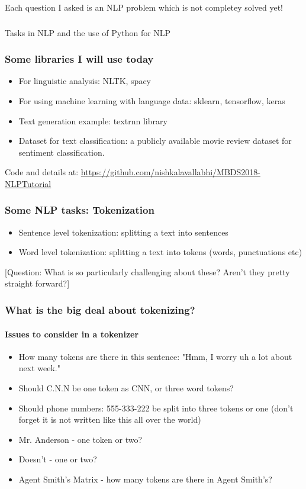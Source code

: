 \documentclass{beamer}
\begin{document}
\begin{frame}
Each question I asked is an NLP problem which is not completey solved yet!
\end{frame} 

\begin{frame}
\frametitle{}
\Large Tasks in NLP and the use of Python for NLP \small
\end{frame}

\begin{frame}
\frametitle{Some libraries I will use today}
\begin{itemize}
\item For linguistic analysis: NLTK, spacy
\item For using machine learning with language data: sklearn, tensorflow, keras
\item Text generation example: textrnn library
\item Dataset for text classification: a publicly available movie review dataset for sentiment classification.
\end{itemize}
Code and details at: \footnotesize \url{https://github.com/nishkalavallabhi/MBDS2018-NLPTutorial}
\end{frame}

\begin{frame}
\frametitle{Some NLP tasks: Tokenization}
\begin{itemize}
\item Sentence level tokenization: splitting a text into sentences
\item Word level tokenization: splitting a text into tokens (words, punctuations etc)
\end{itemize}

[Question: What is so particularly challenging about these? Aren't they pretty straight forward?]
\end{frame}

\begin{frame}
\frametitle{What is the big deal about tokenizing?}
\framesubtitle{Issues to consider in a tokenizer}
\begin{itemize}
\item How many tokens are there in this sentence: "Hmm, I worry uh a lot about next week." \pause
\item Should C.N.N be one token as CNN, or three word tokens? \pause
\item Should phone numbers: 555-333-222 be split into three tokens or one (don't forget it is not written like this all over the world) \pause
\item Mr. Anderson - one token or two? \pause
\item Doesn't - one or two? \pause
\item Agent Smith's Matrix - how many tokens are there in Agent Smith's?
\end{itemize}
\end{frame}
\end{document}
